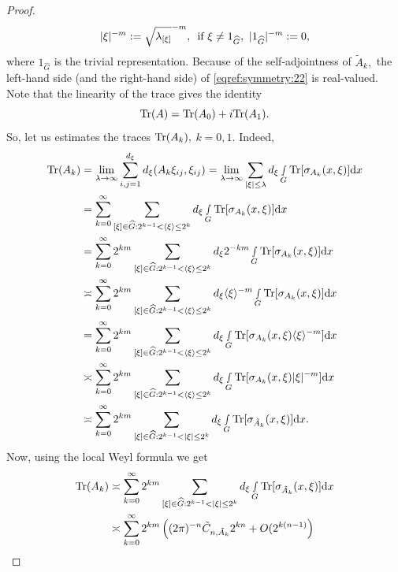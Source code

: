 \documentclass[12pt, reqno]{amsart}
\theoremstyle{definition}
\theoremstyle{remark}
\numberwithin{equation}{section}
\begin{document}
\begin{proof}
$$|\xi|^{-m}:=\sqrt{\lambda_{[\xi]}}^{-m},\,\textnormal{ if }\xi\neq 1_{\widehat{G}}, \,\,|1_{\widehat{G}}|^{-m}:=0,$$ where $1_{\widehat{G}}$ is the trivial representation. 
Because of the self-adjointness of $\tilde A_k,$ the left-hand side (and the right-hand side) of \eqref{eqref:symmetry:22} is real-valued. 
Note that the linearity of the trace gives the identity $$ \textnormal{Tr}(A)= \textnormal{Tr}(A_0)+i\textnormal{Tr}(A_1).$$ So, let us  estimates the traces $\textnormal{Tr}(A_k),$ $k=0,1.$
Indeed,
\begin{align*}
    \textnormal{Tr}(A_k)&=\lim_{\lambda\rightarrow \infty} \sum_{i,j=1}^{d_\xi}d_\xi( A_k\xi_{ij},\xi_{ij})= \lim_{\lambda\rightarrow \infty}  \sum_{|\xi|\leq \lambda}d_\xi\smallint\limits_{G}\textnormal{Tr}[\sigma_{ A_k}(x,\xi)]\textnormal{d}x\\
    &=\sum_{k=0}^\infty  \sum_{[\xi]\in \widehat{G}:2^{k-1}<\langle \xi\rangle \leq 2^{k}}d_\xi\smallint\limits_{G}\textnormal{Tr}[\sigma_{ A_k}(x,\xi)]\textnormal{d}x\\
    &=\sum_{k=0}^\infty 2^{km}  \sum_{[\xi]\in \widehat{G}:2^{k-1}<\langle \xi\rangle \leq 2^{k}}d_\xi  2^{-km} \smallint\limits_{G}\textnormal{Tr}[\sigma_{ A_k}(x,\xi)]\textnormal{d}x\\
    &\asymp \sum_{k=0}^\infty 2^{km}  \sum_{[\xi]\in \widehat{G}:2^{k-1}<\langle \xi\rangle \leq 2^{k}}d_\xi \langle \xi\rangle^{-m} \smallint\limits_{G}\textnormal{Tr}[\sigma_{ A_k}(x,\xi)]\textnormal{d}x\\
     &=\sum_{k=0}^\infty 2^{km}  \sum_{[\xi]\in \widehat{G}:2^{k-1}<\langle \xi\rangle \leq 2^{k}}d_\xi  \smallint\limits_{G}\textnormal{Tr}[\sigma_{ A_k}(x,\xi)\langle \xi\rangle^{-m}]\textnormal{d}x\\
     &\asymp \sum_{k=0}^\infty 2^{km}  \sum_{[\xi]\in \widehat{G}:2^{k-1}<\langle \xi\rangle \leq 2^{k}}d_\xi  \smallint\limits_{G}\textnormal{Tr}[\sigma_{ A_k}(x,\xi)|\xi|^{-m}]\textnormal{d}x\\
     &\asymp \sum_{k=0}^\infty 2^{km}  \sum_{[\xi]\in \widehat{G}:2^{k-1}<| \xi| \leq 2^{k}}d_\xi  \smallint\limits_{G}\textnormal{Tr}[\sigma_{ \tilde A_k}(x,\xi)]\textnormal{d}x.
\end{align*}Now, using the local Weyl formula we get 
\begin{align*}
  \textnormal{Tr}(A_k)&\asymp \sum_{k=0}^\infty 2^{km}  \sum_{[\xi]\in \widehat{G}:2^{k-1}<| \xi| \leq 2^{k}}d_\xi  \smallint\limits_{G}\textnormal{Tr}[\sigma_{ \tilde A_k}(x,\xi)]\textnormal{d}x\\
  &\asymp  \sum_{k=0}^\infty 2^{km} \left( (2\pi)^{-n}\tilde{C}_{n,\tilde A_k}2^{kn}+O(2^{k(n-1)}\right)\\

\end{align*}
\end{proof}
\end{document}
